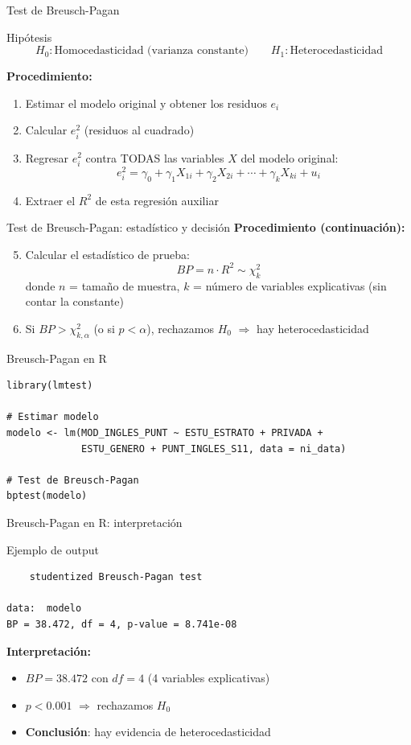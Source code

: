 \documentclass[aspectratio=169, 11pt]{beamer}
\begin{document}
\begin{frame}{Test de Breusch-Pagan}
\begin{block}{Hipótesis}
$$H_0: \text{Homocedasticidad (varianza constante)} \qquad H_1: \text{Heterocedasticidad}$$
\end{block}

\textbf{Procedimiento:}
\begin{enumerate}
\item Estimar el modelo original y obtener los residuos $e_i$
\item Calcular $e_i^2$ (residuos al cuadrado)
\item Regresar $e_i^2$ contra TODAS las variables $X$ del modelo original:
  $$e_i^2 = \gamma_0 + \gamma_1 X_{1i} + \gamma_2 X_{2i} + \cdots + \gamma_k X_{ki} + u_i$$
\item Extraer el $R^2$ de esta regresión auxiliar
\end{enumerate}
\end{frame}

\begin{frame}{Test de Breusch-Pagan: estadístico y decisión}
\textbf{Procedimiento (continuación):}
\begin{enumerate}\setcounter{enumi}{4}
\item Calcular el estadístico de prueba:
  $$BP = n \cdot R^2 \sim \chi^2_{k}$$
  donde $n$ = tamaño de muestra, $k$ = número de variables explicativas (sin contar la constante)
\item Si $BP > \chi^2_{k, \alpha}$ (o si $p < \alpha$), rechazamos $H_0$ $\Rightarrow$ hay heterocedasticidad
\end{enumerate}
\end{frame}

\begin{frame}[fragile]{Breusch-Pagan en R}
\begin{lstlisting}
library(lmtest)

# Estimar modelo
modelo <- lm(MOD_INGLES_PUNT ~ ESTU_ESTRATO + PRIVADA +
             ESTU_GENERO + PUNT_INGLES_S11, data = ni_data)

# Test de Breusch-Pagan
bptest(modelo)
\end{lstlisting}
\end{frame}

\begin{frame}[fragile]{Breusch-Pagan en R: interpretación}
\begin{exampleblock}{Ejemplo de output}
\small
\begin{verbatim}
    studentized Breusch-Pagan test

data:  modelo
BP = 38.472, df = 4, p-value = 8.741e-08
\end{verbatim}
\end{exampleblock}

\textbf{Interpretación:}
\begin{itemize}
\item $BP = 38.472$ con $df = 4$ (4 variables explicativas)
\item $p < 0.001$ $\Rightarrow$ rechazamos $H_0$
\item \textbf{Conclusión}: hay evidencia de heterocedasticidad
\end{itemize}
\end{frame}
\end{document}

